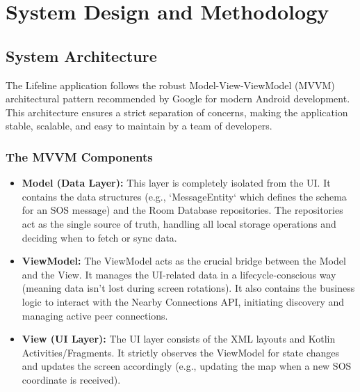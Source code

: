 
\chapter{System Design and Methodology} 

\label{Chapter3}

\section{System Architecture}
The Lifeline application follows the robust Model-View-ViewModel (MVVM) architectural pattern recommended by Google for modern Android development. This architecture ensures a strict separation of concerns, making the application stable, scalable, and easy to maintain by a team of developers. 

\subsection{The MVVM Components}
\begin{itemize}
    \item \textbf{Model (Data Layer):} This layer is completely isolated from the UI. It contains the data structures (e.g., `MessageEntity` which defines the schema for an SOS message) and the Room Database repositories. The repositories act as the single source of truth, handling all local storage operations and deciding when to fetch or sync data.
    \item \textbf{ViewModel:} The ViewModel acts as the crucial bridge between the Model and the View. It manages the UI-related data in a lifecycle-conscious way (meaning data isn't lost during screen rotations). It also contains the business logic to interact with the Nearby Connections API, initiating discovery and managing active peer connections.
    \item \textbf{View (UI Layer):} The UI layer consists of the XML layouts and Kotlin Activities/Fragments. It strictly observes the ViewModel for state changes and updates the screen accordingly (e.g., updating the map when a new SOS coordinate is received).
\end{itemize}

